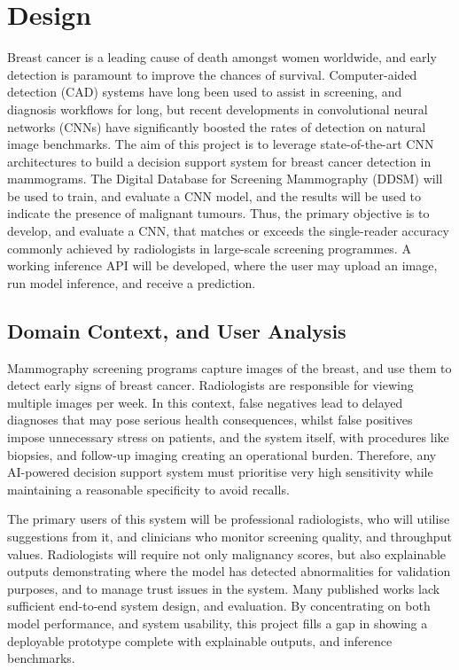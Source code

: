 \documentclass[../main]{subfiles}
\begin{document}
\chapter{Design}
Breast cancer is a leading cause of death amongst women worldwide, and early detection is paramount to improve the chances of survival. Computer-aided detection (CAD) systems have long been used to assist in screening, and diagnosis workflows for long, but recent developments in convolutional neural networks (CNNs) have significantly boosted the rates of detection on natural image benchmarks. The aim of this project is to leverage state-of-the-art CNN architectures to build a decision support system for breast cancer detection in mammograms. The Digital Database for Screening Mammography (DDSM) will be used to train, and evaluate a CNN model, and the results will be used to indicate the presence of malignant tumours. Thus, the primary objective is to develop, and evaluate a CNN, that matches or exceeds the single-reader accuracy commonly achieved by radiologists in large-scale screening programmes. A working inference API will be developed, where the user may upload an image, run model inference, and receive a prediction.

\section{Domain Context, and User Analysis}
Mammography screening programs capture images of the breast, and use them to detect early signs of breast cancer. Radiologists are responsible for viewing multiple images per week. In this context, false negatives lead to delayed diagnoses that may pose serious health consequences, whilst false positives impose unnecessary stress on patients, and the system itself, with procedures like biopsies, and follow-up imaging creating an operational burden. Therefore, any AI-powered decision support system must prioritise very high sensitivity while maintaining a reasonable specificity to avoid recalls.

The primary users of this system will be professional radiologists, who will utilise suggestions from it, and clinicians who monitor screening quality, and throughput values. Radiologists will require not only malignancy scores, but also explainable outputs demonstrating where the model has detected abnormalities for validation purposes, and to manage trust issues in the system. Many published works lack sufficient end-to-end system design, and evaluation. By concentrating on both model performance, and system usability, this project fills a gap in showing a deployable prototype complete with explainable outputs, and inference benchmarks.
\end{document}

